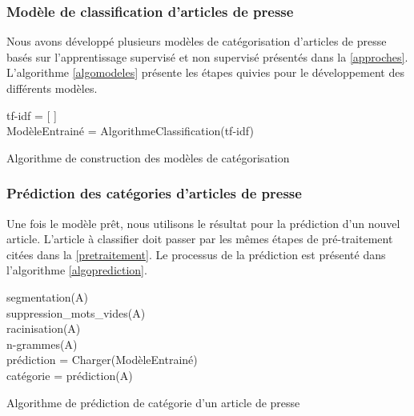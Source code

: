         \subsubsection{Modèle de classification d'articles de presse}
            Nous avons développé plusieurs modèles de catégorisation d'articles de presse basés sur l'apprentissage supervisé et non supervisé présentés dans la \autoref{approches}. L'algorithme \autoref{algomodeles} présente les étapes quivies pour le développement des différents modèles.

            \begin{algorithm2e}[H]
            \label{algomodeles}
            \SetAlgoLined
            tf-idf = [ ]\\
            ModèleEntrainé = AlgorithmeClassification(tf-idf)\\
            \caption{Algorithme de construction des modèles de catégorisation}
            \end{algorithm2e}

        \subsubsection{Prédiction des catégories d'articles de presse}
            Une fois le modèle prêt, nous utilisons le résultat pour la prédiction d'un nouvel article. L'article à classifier doit passer par les mêmes étapes de pré-traitement citées dans la \autoref{pretraitement}. Le processus de la prédiction est présenté dans l'algorithme \autoref{algoprediction}.

            \begin{algorithm2e}[H]
            \label{algoprediction}
            \SetAlgoLined
            segmentation(A)\\
            suppression\_mots\_vides(A)\\
            racinisation(A)\\
            n-grammes(A)\\
            prédiction = Charger(ModèleEntrainé)\\
            catégorie = prédiction(A)\\
            \caption{Algorithme de prédiction de catégorie d'un article de presse}
            \end{algorithm2e}

